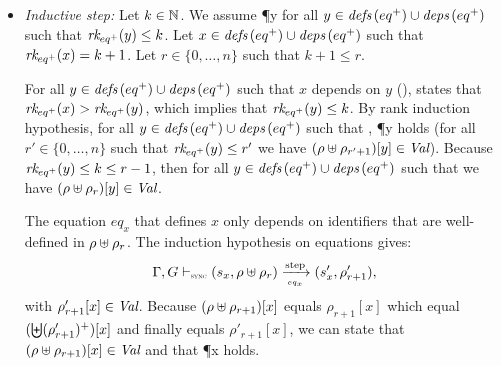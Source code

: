 \begin{skippableproof}
\begin{itemize}
              The structural induction hypothesis on equations gives:
              \begin{equation*}
                  \eqOpsem{\rho \ctxconcat \rho_r}{s_x}{eq_x}{s'_x}{\rho'_{r+1}},
              \end{equation*}
              with $\rho'_{r+1}[x] \in \Val$.
              Because $(\rho \ctxconcat \rho_{r+1})[x]$ equals $\rho_{r+1}[x]$ which equal
              $(\bigCtxconcat (\rho'_{r+1})^+)[x]$ and finally equals $\rho'_{r+1}[x]$, we can
              state that $(\rho \ctxconcat \rho_{r+1})[x] \in \Val$ and that \P{x} holds.

        \item \textit{Inductive step:} Let $k \in \mathbb{N}$.
              We assume \P{y} for all $y \in {\ensuremath{\textit{defs}\left(eq^+\right)}} \cup {\ensuremath{\textit{deps}\left(eq^+\right)}}$ such that ${\textit{rk}_{eq^+}(y)} \le k$.
              Let $x \in {\ensuremath{\textit{defs}\left(eq^+\right)}} \cup {\ensuremath{\textit{deps}\left(eq^+\right)}}$ such that ${\textit{rk}_{eq^+}(x)} = k+1$.
              Let $r \in \{0, \dots, n\}$ such that $k+1 \le r$.

              For all $y \in {\ensuremath{\textit{defs}\left(eq^+\right)}} \cup {\ensuremath{\textit{deps}\left(eq^+\right)}}$ such that $x$ depends on $y$ (\ie {}),
              states that ${\textit{rk}_{eq^+}(x)} > {\textit{rk}_{eq^+}(y)}$, which implies that ${\textit{rk}_{eq^+}(y)} \le k$.
              By rank induction hypothesis, for all $y \in {\ensuremath{\textit{defs}\left(eq^+\right)}} \cup {\ensuremath{\textit{deps}\left(eq^+\right)}}$ such that
              , \P{y} holds (\ie for all $r' \in \{0, \dots, n\}$ such that
              ${\textit{rk}_{eq^+}(y)} \le r'$ we have $(\rho \uplus \rho_{r'+1})[y] \in \textit{Val}$).
              Because ${\textit{rk}_{eq^+}(y)} \le k \le r-1$, then for all $y \in {\ensuremath{\textit{defs}\left(eq^+\right)}} \cup {\ensuremath{\textit{deps}\left(eq^+\right)}}$ such that
               we have $(\rho \uplus \rho_r)[y] \in \textit{Val}$.

              The equation $eq_x$ that defines $x$ only depends on identifiers that are well-defined
              in $\rho \uplus \rho_r$. The induction hypothesis on equations gives:
              \begin{equation*}
                  \eqOpsem{\rho \ctxconcat \rho_r}{s_x}{eq_x}{s'_x}{\rho'_{r+1}},
              \end{equation*}
              with  $\rho'_{r+1}[x] \in \Val$.
              Because $(\rho \ctxconcat \rho_{r+1})[x]$ equals $\rho_{r+1}[x]$ which equal
              $(\bigCtxconcat (\rho'_{r+1})^+)[x]$ and finally equals $\rho'_{r+1}[x]$, we can
              state that $(\rho \ctxconcat \rho_{r+1})[x] \in \Val$ and that \P{x} holds.
    \end{itemize}


\end{skippableproof}
